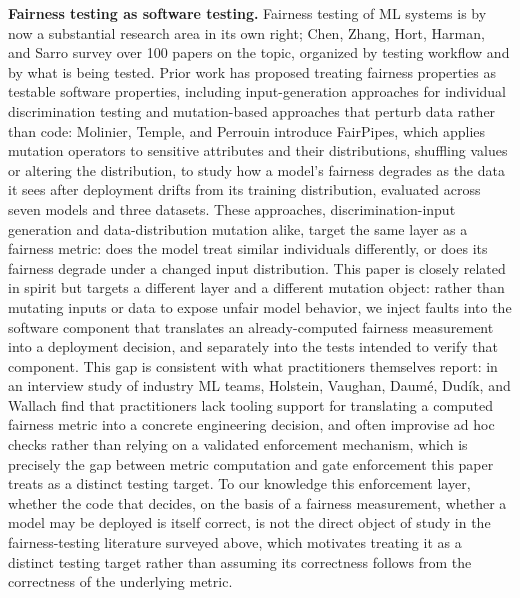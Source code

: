\documentclass[]{einformatica}
\begin{document}
\textbf{Fairness testing as software testing.} Fairness testing of ML systems is by now a substantial research area in its own right; Chen, Zhang, Hort, Harman, and Sarro \cite{Chen2024} survey over 100 papers on the topic, organized by testing workflow and by what is being tested. Prior work has proposed treating fairness properties as testable software properties, including input-generation approaches for individual discrimination testing \cite{Galhotra2017,Udeshi2018} and mutation-based approaches that perturb data rather than code: Molinier, Temple, and Perrouin \cite{Molinier2024} introduce FairPipes, which applies mutation operators to sensitive attributes and their distributions, shuffling values or altering the distribution, to study how a model's fairness degrades as the data it sees after deployment drifts from its training distribution, evaluated across seven models and three datasets. These approaches, discrimination-input generation and data-distribution mutation alike, target the same layer as a fairness metric: does the model treat similar individuals differently, or does its fairness degrade under a changed input distribution. This paper is closely related in spirit but targets a different layer and a different mutation object: rather than mutating inputs or data to expose unfair model behavior, we inject faults into the software component that translates an already-computed fairness measurement into a deployment decision, and separately into the tests intended to verify that component. This gap is consistent with what practitioners themselves report: in an interview study of industry ML teams, Holstein, Vaughan, Daum\'e, Dud\'ik, and Wallach \cite{Holstein2019} find that practitioners lack tooling support for translating a computed fairness metric into a concrete engineering decision, and often improvise ad hoc checks rather than relying on a validated enforcement mechanism, which is precisely the gap between metric computation and gate enforcement this paper treats as a distinct testing target. To our knowledge this enforcement layer, whether the code that decides, on the basis of a fairness measurement, whether a model may be deployed is itself correct, is not the direct object of study in the fairness-testing literature surveyed above, which motivates treating it as a distinct testing target rather than assuming its correctness follows from the correctness of the underlying metric.
\end{document}
